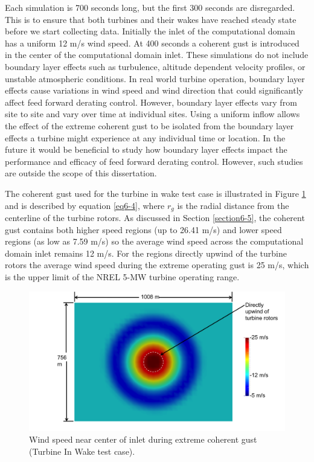 Each simulation is 700 seconds long, but the first 300 seconds are disregarded. This is to ensure that both turbines and their wakes have reached steady state before we start collecting data. Initially the inlet of the computational domain has a uniform 12 m/s wind speed. At 400 seconds a coherent gust is introduced in the center of the computational domain inlet. These simulations do not include boundary layer effects such as turbulence, altitude dependent velocity profiles, or unstable atmospheric conditions. In real world turbine operation, boundary layer effects cause variations in wind speed and wind direction that could significantly affect feed forward derating control. However, boundary layer effects vary from site to site and vary over time at individual sites. Using a uniform inflow allows the effect of the extreme coherent gust to be isolated from the boundary layer effects a turbine might experience at any individual time or location. In the future it would be beneficial to study how boundary layer effects impact the performance and efficacy of feed forward derating control. However, such studies are outside the scope of this dissertation.

The coherent gust used for the turbine in wake test case is illustrated in Figure \ref{fig6-26} and is described by equation \ref{eq6-4}, where $r_g$ is the radial distance from the centerline of the turbine rotors. As discussed in Section \ref{section6-5}, the coherent gust contains both higher speed regions (up to 26.41 m/s) and lower speed regions (as low as 7.59 m/s) so the average wind speed across the computational domain inlet remains 12 m/s. For the regions directly upwind of the turbine rotors the average wind speed during the extreme operating gust is 25 m/s, which is the upper limit of the NREL 5-MW turbine operating range. 

\begin{figure}[ht] 
	\centering
		\includegraphics[width = \linewidth]{Figures/ch6Figures/fig6-26.png}

	\caption{Wind speed near center of inlet during extreme coherent gust (Turbine In Wake test case).}
	\label{fig6-26} 
\end{figure}

